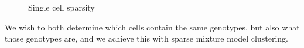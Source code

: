 \begin{figure}[h!]
\caption{Single cell sparsity}
\label{figure:scdatafigure}
\begin{centering}
\end{centering}
\end{figure}

We wish to both determine which cells contain the same genotypes, but also what those genotypes are, and we achieve this with sparse mixture model clustering. \\

